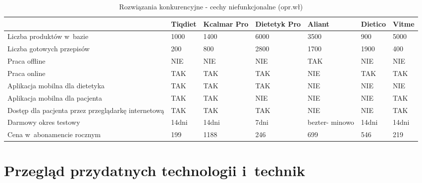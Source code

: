 \begin{minipage}{\textwidth}
    \begin{table}[H]
        \centering\caption{Rozwiązania konkurencyjne - cechy niefunkcjonalne (opr.wł)\label{tabela:rozwiazania-konkurencyjne-niefunkcjonalne}}
        \begin{tabular}{|P{.22\textwidth}|P{.09\textwidth}|P{.09\textwidth}|P{.09\textwidth}|P{.09\textwidth}|P{.09\textwidth}|P{.09\textwidth}|}
            \hline
                                                & Tiqdiet   & Kcalmar Pro   & Dietetyk Pro & Aliant         & Dietico   & Vitme   \\ \hline
            Liczba produktów w~bazie            & 1000      & 1400          & 6000         & 3500           & 900       & 5000    \\ \hline
            Liczba gotowych przepisów           & 200       & 800           & 2800         & 1700           & 1900      & 400     \\ \hline
            Praca offline                       & NIE       & NIE           & NIE          & TAK            & NIE       & NIE     \\ \hline
            Praca online                        & TAK       & TAK           & TAK          & NIE            & TAK       & TAK     \\ \hline
            Aplikacja mobilna dla dietetyka     & TAK       & TAK           & TAK          & NIE            & NIE       & NIE     \\ \hline
            Aplikacja mobilna dla pacjenta      & TAK       & TAK           & NIE          & NIE            & NIE       & TAK     \\ \hline
            Dostęp dla pacjenta przez przeglądarkę internetową       & TAK       & TAK           & TAK          & NIE            & NIE       & TAK     \\ \hline
            Darmowy okres testowy               & 14dni     & 14dni         & 7dni         & bezter- minowo & 14dni     & 14dni   \\ \hline
            Cena w~abonamencie rocznym          & 199       & 1188          & 246          & 699            & 546       & 219     \\ \hline
        \end{tabular}
    \end{table}
\end{minipage}

\section{Przegląd przydatnych technologii i~technik}\label{sec:usefull-technologies}

